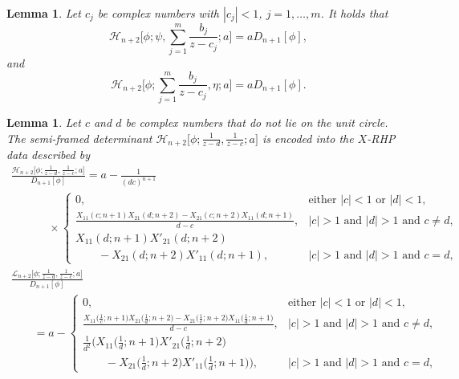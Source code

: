 \documentclass[10pt,a4paper]{amsart}
\numberwithin{equation}{section}
\newtheorem{Lemma}[Theorem]{Lemma}
 { \theoremstyle{definition}
\newtheorem{Definition}[Theorem]{Definition}
\newtheorem{Example}[Theorem]{Example}
\newtheorem{Remark}[Theorem]{Remark}
\newtheorem{Question}[Theorem]{Question}
}
\newcommand{\di}{\displaystyle}
\begin{document}
		\begin{Lemma}
			Let $c_j$ be complex numbers with $|c_j|<1$, $j=1,\dots,m$. It holds that
			\begin{equation*}
				\mathscr{H}_{n+2}\Bigg[\phi;\psi,\sum_{j=1}^{m}\frac{b_j}{z-c_j};a\Bigg] = a D_{n+1}[\phi],
			\end{equation*}
			and
			\begin{equation*}
				\mathscr{H}_{n+2}\Bigg[\phi;\sum_{j=1}^{m}\frac{b_j}{z-c_j},\eta;a\Bigg] = a D_{n+1}[\phi].
			\end{equation*}
		\end{Lemma}
		\begin{Lemma}\label{thm semi-framed rationals}
			Let $c$ and $d$ be complex numbers that do not lie on the unit circle. The semi-framed determinant $\mathscr{H}_{n+2}\big[\phi;\di \tfrac{1}{z-d},\di \tfrac{1}{z-c};a\big]$ is encoded into the $X$-RHP data described by
			\begin{gather}%
						\frac{\mathscr{H}_{n+2}\big[\phi; \tfrac{1}{z-d},\tfrac{1}{z-c};a\big]}{D_{n+1}[\phi]}
= a - \frac{1}{ (dc)^{n+1}}\nonumber \\
\phantom{\qquad = }{}\times \!\!\begin{cases}
						0, & \text{either $|c|<1$ or $|d|<1$,} \\
						 \tfrac{ X_{11}(c;n+1)X_{21}(d;n+2) - X_{21}(c;n+2)X_{11}(d;n+1) }{d-c}, & \text{$|c|>1$ and $|d|>1$ and $c \neq d$,} \\
						X_{11}(d;n+1)X'_{21}(d;n+2)&\\
 \qquad- X_{21}(d;n+2)X'_{11}(d;n+1), & \text{$|c|>1$ and $|d|>1$ and $c = d$,}
					\end{cases}\label{Hn+2 rationals X-RHP}\\
						\frac{\mathscr{L}_{n+2}\big[\phi; \tfrac{1}{z-d},\tfrac{1}{z-c};a\big]}{D_{n+1}[\phi]} \nonumber\\
\qquad= a -\! \begin{cases}
						0, & \text{either $|c|<1$ or $|d|<1$,} \\
						 \tfrac{ X_{11}\big(\tfrac{1}{c};n+1\big)X_{21}\big(\tfrac{1}{d};n+2\big) - X_{21}\big(\tfrac{1}{c};n+2\big)X_{11}\big(\tfrac{1}{d};n+1\big) }{d-c}, & \text{$|c|>1$ and $|d|>1$ and $c \neq d$}, \\
						\tfrac{1}{d^2} \big( X_{11}\big(\tfrac{1}{d};n+1\big)X'_{21}\big(\tfrac{1}{d};n+2\big) &\\
\qquad- X_{21}\big(\tfrac{1}{d};n+2\big)X'_{11}\big(\tfrac{1}{d};n+1\big) \big), & \text{$|c|>1$ and $|d|>1$ and $c = d$,}\nonumber

\end{cases}
\end{gather}
\end{Lemma}
\end{document}
